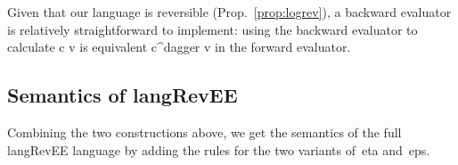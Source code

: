 \documentclass[preprint]{sigplanconf}
\begin{document}
Given that our language is reversible (Prop.~\ref{prop:logrev}), a backward
evaluator is relatively straightforward to implement: using the backward
evaluator to calculate {{c v}} is equivalent {{c^{dagger} v}} in the forward
evaluator.


\subsection{Semantics of {{langRevEE}} }

Combining the two constructions above, we get the semantics of the full
{{langRevEE}} language by adding the rules for the two variants of~{{eta}}
and~{{eps}}.
\end{document}
